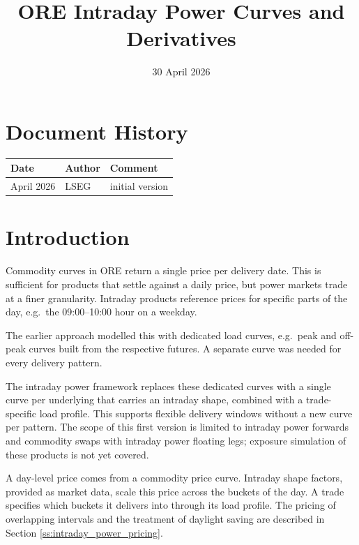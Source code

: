 \documentclass[12pt, a4paper]{article}
\begin{document}
\title{ORE Intraday Power Curves and Derivatives}
\date{30 April 2026}
\maketitle

\newpage

\section*{Document History}

\begin{center}
\begin{supertabular}{|l|l|p{9cm}|}
\hline
Date & Author & Comment \\
\hline
April 2026 & LSEG & initial version\\
\hline
\end{supertabular}
\end{center}

\newpage

\tableofcontents

\newpage

\section{Introduction}

Commodity curves in ORE return a single price per delivery date. This is sufficient for products that settle against a
daily price, but power markets trade at a finer granularity. Intraday products reference prices for specific parts of
the day, e.g.\ the 09:00--10:00 hour on a weekday.

The earlier approach modelled this with dedicated load curves, e.g.\ peak and off-peak curves built from the
respective futures. A separate curve was needed for every delivery pattern.

The intraday power framework replaces these dedicated curves with a single curve per underlying that carries an
intraday shape, combined with a trade-specific load profile. This supports flexible delivery windows
without a new curve per pattern. The scope of this first version is limited to intraday power forwards and commodity swaps with 
intraday power floating legs; exposure simulation of these products is not yet covered.

A day-level price comes from a commodity price curve. Intraday shape factors, provided as market data, scale this
price across the buckets of the day. A trade specifies which buckets it delivers into through its load profile. The
pricing of overlapping intervals and the treatment of daylight saving are described in Section
\ref{ss:intraday_power_pricing}.
\end{document}
